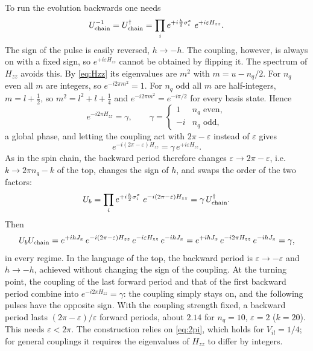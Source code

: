 \documentclass[11pt,a4paper]{article}
\begin{document}
To run the evolution backwards one needs
\begin{equation}
  U_{\rm chain}^{-1} = U_{\rm chain}^\dagger = \prod_{i}e^{+i\frac h2\sigma^x_i}\;e^{+i\varepsilon H_{zz}} .
\end{equation}
The sign of the pulse is easily reversed, $h\to-h$. The coupling, however, is always on with a fixed sign, so
$e^{+i\varepsilon H_{zz}}$ cannot be obtained by flipping it. The spectrum of $H_{zz}$ avoids this. By \cref{eq:Hzz}
its eigenvalues are $m^2$ with $m=u-n_q/2$. For $n_q$ even all $m$ are integers, so $e^{-i2\pi m^2}=1$. For $n_q$ odd
all $m$ are half-integers, $m=l+\frac12$, so $m^2=l^2+l+\frac14$ and $e^{-i2\pi m^2}=e^{-i\pi/2}$ for every basis
state. Hence
\begin{equation}\label{eq:2pi}
  e^{-i2\pi H_{zz}} = \gamma,\qquad \gamma = \begin{cases} 1 & n_q \text{ even},\\ -i & n_q\text{ odd},\end{cases}
\end{equation}
a global phase, and letting the coupling act with $2\pi-\varepsilon$ instead of $\varepsilon$ gives
\begin{equation}
  e^{-i(2\pi-\varepsilon)H_{zz}} = \gamma\,e^{+i\varepsilon H_{zz}} .
\end{equation}
As in the spin chain, the backward period therefore changes $\varepsilon\to2\pi-\varepsilon$, i.e.\
$k\to2\pi n_q-k$ of the top, changes the sign of $h$, and swaps the order of the two factors:
\begin{equation}\label{eq:Ub}
  U_b = \prod_{i}e^{+i\frac h2\sigma^x_i}\;e^{-i(2\pi-\varepsilon)H_{zz}} = \gamma\,U_{\rm chain}^\dagger .
\end{equation}
Then
\begin{equation}
  U_bU_{\rm chain} = e^{+ihJ_x}\,e^{-i(2\pi-\varepsilon)H_{zz}}\,e^{-i\varepsilon H_{zz}}\,e^{-ihJ_x}
  = e^{+ihJ_x}\,e^{-i2\pi H_{zz}}\,e^{-ihJ_x} = \gamma ,
\end{equation}
in every regime. In the language of the top, the backward period is $\varepsilon\to-\varepsilon$ and $h\to-h$, achieved without changing
the sign of the coupling. At the turning point, the coupling of the last forward period and that of the first backward
period combine into $e^{-i2\pi H_{zz}}=\gamma$: the coupling simply stays on, and the following pulses have the
opposite sign. With the coupling strength fixed, a backward period lasts $(2\pi-\varepsilon)/\varepsilon$ forward
periods, about $2.14$ for $n_q=10$, $\varepsilon=2$ ($k=20$). This needs $\varepsilon<2\pi$. The construction relies on
\cref{eq:2pi}, which holds for $V_{il}=1/4$; for general couplings it requires the eigenvalues of $H_{zz}$ to differ by
integers.
\end{document}

